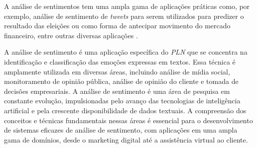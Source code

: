 
A análise de sentimentos tem uma ampla gama de aplicações práticas como, por exemplo, análise de sentimento de \textit{tweets} para serem utilizados para predizer o resultado das eleições ou como forma de antecipar movimento do mercado financeiro, entre outras diversas aplicações \cite{Liu2012}.

A análise de sentimento é uma aplicação específica do \textit{PLN} que se concentra na identificação e classificação das emoções expressas em textos. Essa técnica é amplamente utilizada em diversas áreas, incluindo análise de mídia social, monitoramento de opinião pública, análise de opinião do cliente e tomada de decisões empresariais. A análise de sentimento é uma área de pesquisa em constante evolução, impulsionadas pelo avanço das tecnologias de inteligência artificial e pela crescente disponibilidade de dados textuais. A compreensão dos conceitos e técnicas fundamentais nessas áreas é essencial para o desenvolvimento de sistemas eficazes de análise de sentimento, com aplicações em uma ampla gama de domínios, desde o marketing digital até a assistência virtual ao cliente.
